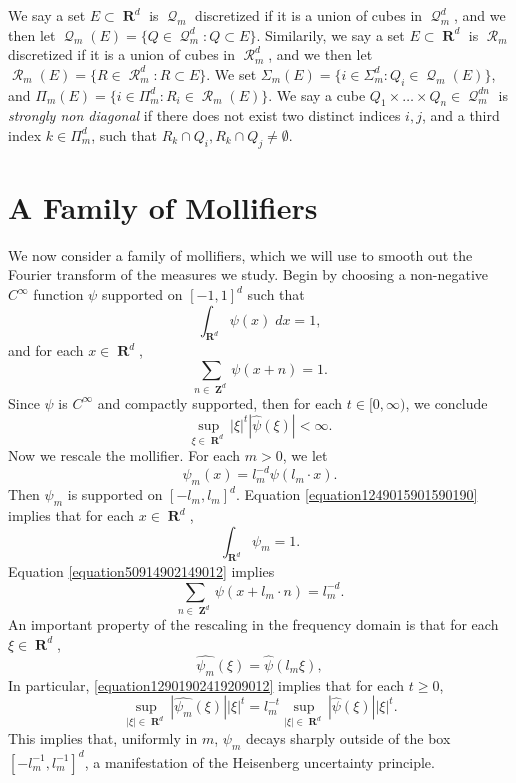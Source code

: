 \documentclass[12pt,reqno]{amsart}
\DeclareMathOperator{\RR}{\mathbf{R}}
\DeclareMathOperator{\ZZ}{\mathbf{Z}}
\DeclareMathOperator{\DQ}{\mathcal{Q}}
\DeclareMathOperator{\DR}{\mathcal{R}}
\begin{document}
We say a set $E \subset \RR^d$ is $\DQ_m$ discretized if it is a union of cubes in $\DQ_m^d$, and we then let $\DQ_m(E) = \{ Q \in \DQ_m^d : Q \subset E \}$. Similarily, we say a set $E \subset \RR^d$ is $\DR_m$ discretized if it is a union of cubes in $\DR_m^d$, and we then let $\DR_m(E) = \{ R \in \DR_m^d : R \subset E \}$. We set $\Sigma_m(E) = \{ i \in \Sigma_m^d : Q_i \in \DQ_m(E) \}$, and $\Pi_m(E) = \{ i \in \Pi_m^d : R_i \in \DR_m(E) \}$. We say a cube $Q_1 \times \dots \times Q_n \in \DQ_m^{dn}$ is \emph{strongly non diagonal} if there does not exist two distinct indices $i,j$, and a third index $k \in \Pi_m^d$, such that $R_k \cap Q_i, R_k \cap Q_j \neq \emptyset$.

\section{A Family of Mollifiers}

We now consider a family of mollifiers, which we will use to smooth out the Fourier transform of the measures we study. Begin by choosing a non-negative $C^\infty$ function $\psi$ supported on $[-1,1]^d$ such that
%
\begin{equation} \label{equation1249015901590190}
	\int_{\RR^d} \psi(x)\; dx = 1,
\end{equation}
%
and for each $x \in \RR^d$,
%
\begin{equation} \label{equation50914902149012}
	\sum_{n \in \ZZ^d} \psi(x + n) = 1.
\end{equation}
%
Since $\psi$ is $C^\infty$ and compactly supported, then for each $t \in [0,\infty)$, we conclude
%
\begin{equation} \label{equation682928418931289}
	\sup_{\xi \in \RR^d} |\xi|^t |\widehat{\psi}(\xi)| < \infty.
\end{equation}
%
Now we rescale the mollifier. For each $m > 0$, we let
%
\[ \psi_m(x) = l_m^{-d} \psi(l_m \cdot x). \]
%
Then $\psi_m$ is supported on $[-l_m,l_m]^d$. Equation \eqref{equation1249015901590190} implies that for each $x \in \RR^d$,
%
\begin{equation} \label{equation19204910490190190}
	\int_{\RR^d} \psi_m = 1.
\end{equation}
%
Equation \eqref{equation50914902149012} implies
%
\begin{equation} \label{equation990249012409129041290} \sum_{n \in \ZZ^d} \psi(x + l_m \cdot n) = l_m^{-d}. \end{equation}
%
An important property of the rescaling in the frequency domain is that for each $\xi \in \RR^d$,
%
\begin{equation} \label{equation12901902419209012}
    \widehat{\psi_m}(\xi) = \widehat{\psi}(l_m \xi),
\end{equation}
%
In particular, \eqref{equation12901902419209012} implies that for each $t \geq 0$,
%
\begin{equation}
    \sup_{|\xi| \in \RR^d} |\widehat{\psi_m}(\xi)| |\xi|^t = l_m^{-t} \sup_{|\xi| \in \RR^d} |\widehat{\psi}(\xi)| |\xi|^t.
\end{equation}
%
This implies that, uniformly in $m$, $\widehat{\psi_m}$ decays sharply outside of the box $[-l_m^{-1}, l_m^{-1}]^d$, a manifestation of the Heisenberg uncertainty principle.
\end{document}
